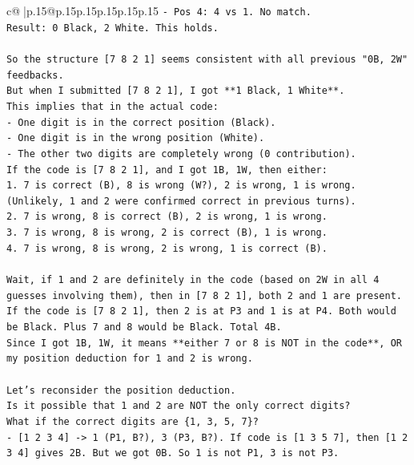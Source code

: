 \documentclass{article}
\begin{document}
{\begin{supertabular}{c@{$\;$}|p{.15\linewidth}@{}p{.15\linewidth}p{.15\linewidth}p{.15\linewidth}p{.15\linewidth}p{.15\linewidth}}
{{{\texttt{{-} Pos 4: 4 vs 1. No match.} \\
\texttt{Result: 0 Black, 2 White. This holds.} \\
\\ 
\texttt{So the structure {[}7 8 2 1{]} seems consistent with all previous "0B, 2W" feedbacks.} \\
\texttt{But when I submitted {[}7 8 2 1{]}, I got **1 Black, 1 White**.} \\
\texttt{This implies that in the actual code:} \\
\texttt{{-} One digit is in the correct position (Black).} \\
\texttt{{-} One digit is in the wrong position (White).} \\
\texttt{{-} The other two digits are completely wrong (0 contribution).} \\
\texttt{If the code is {[}7 8 2 1{]}, and I got 1B, 1W, then either:} \\
\texttt{1. 7 is correct (B), 8 is wrong (W?), 2 is wrong, 1 is wrong. (Unlikely, 1 and 2 were confirmed correct in previous turns).} \\
\texttt{2. 7 is wrong, 8 is correct (B), 2 is wrong, 1 is wrong.} \\
\texttt{3. 7 is wrong, 8 is wrong, 2 is correct (B), 1 is wrong.} \\
\texttt{4. 7 is wrong, 8 is wrong, 2 is wrong, 1 is correct (B).} \\
\\ 
\texttt{Wait, if 1 and 2 are definitely in the code (based on 2W in all 4 guesses involving them), then in {[}7 8 2 1{]}, both 2 and 1 are present.} \\
\texttt{If the code is {[}7 8 2 1{]}, then 2 is at P3 and 1 is at P4. Both would be Black. Plus 7 and 8 would be Black. Total 4B.} \\
\texttt{Since I got 1B, 1W, it means **either 7 or 8 is NOT in the code**, OR my position deduction for 1 and 2 is wrong.} \\
\\ 
\texttt{Let's reconsider the position deduction.} \\
\texttt{Is it possible that 1 and 2 are NOT the only correct digits?} \\
\texttt{What if the correct digits are \{1, 3, 5, 7\}?} \\
\texttt{{-} {[}1 2 3 4{]} {-}> 1 (P1, B?), 3 (P3, B?). If code is {[}1 3 5 7{]}, then {[}1 2 3 4{]} gives 2B. But we got 0B. So 1 is not P1, 3 is not P3.} \\
}}}
\end{supertabular}}
\end{document}
